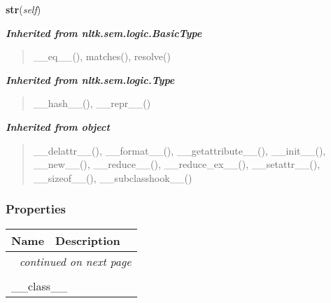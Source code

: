     \label{temporaldrt:TimeType:str}

    \vspace{0.5ex}

\hspace{.8\funcindent}\begin{boxedminipage}{\funcwidth}

    \raggedright \textbf{str}(\textit{self})

\setlength{\parskip}{2ex}
\setlength{\parskip}{1ex}
    \end{boxedminipage}


\large{\textbf{\textit{Inherited from nltk.sem.logic.BasicType}}}

\begin{quote}
\_\_eq\_\_(), matches(), resolve()
\end{quote}

\large{\textbf{\textit{Inherited from nltk.sem.logic.Type}}}

\begin{quote}
\_\_hash\_\_(), \_\_repr\_\_()
\end{quote}

\large{\textbf{\textit{Inherited from object}}}

\begin{quote}
\_\_delattr\_\_(), \_\_format\_\_(), \_\_getattribute\_\_(), \_\_init\_\_(), \_\_new\_\_(), \_\_reduce\_\_(), \_\_reduce\_ex\_\_(), \_\_setattr\_\_(), \_\_sizeof\_\_(), \_\_subclasshook\_\_()
\end{quote}


  \subsubsection{Properties}

    \vspace{-1cm}
\hspace{\varindent}\begin{longtable}{|p{\varnamewidth}|p{\vardescrwidth}|l}
\cline{1-2}
\cline{1-2} \centering \textbf{Name} & \centering \textbf{Description}& \\
\cline{1-2}
\endhead\cline{1-2}\multicolumn{3}{r}{\small\textit{continued on next page}}\\\endfoot\cline{1-2}
\endlastfoot\multicolumn{2}{|l|}{\textit{Inherited from object}}\\
\multicolumn{2}{|p{\varwidth}|}{\raggedright \_\_class\_\_}\\
\cline{1-2}
\end{longtable}

